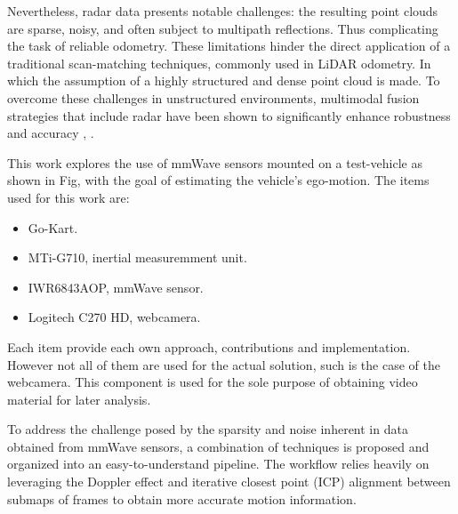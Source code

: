 Nevertheless, radar data presents notable challenges: the resulting point clouds are sparse, noisy, and often subject to multipath reflections. 
Thus complicating the task of reliable odometry.  
These limitations hinder the direct application of a traditional scan-matching techniques, commonly used in LiDAR odometry. In which the assumption of a highly structured and dense point cloud is made.
To overcome these challenges in unstructured environments, multimodal fusion strategies that include radar have been shown to significantly enhance robustness and accuracy \cite{Multimodal_Offroad}, \cite{HighSpeed_Estimation}.

\begin{comment}
    [25/09/2025]
    Here introduce the Go-Kart, dont leave it as "vehicle"
\end{comment}
This work explores the use of mmWave sensors mounted on a test-vehicle as shown in Fig, with the goal of estimating the vehicle's ego-motion.
The items used for this work are:
\begin{itemize}
    \item Go-Kart.
    \item MTi-G710, inertial measuremment unit.
    \item IWR6843AOP, mmWave sensor.
    \item Logitech C270 HD, webcamera.
\end{itemize}

Each item provide each own approach, contributions and implementation.
However not all of them are used for the actual solution, such is the case of the webcamera.
This component is used for the sole purpose of obtaining video material for later analysis.

\begin{comment}
    [25/09/2025]
    Check if this section shall be deleted or integrated with final result.
    As for integration is not such a great idea to implement a summarize of the project here.
    Only a brief introduction of the project shall discussed here.
    Contributions can be kept. As they are the whole intention of what it is accomplished here.
\end{comment}

To address the challenge posed by the sparsity and noise inherent in data obtained from mmWave sensors, a combination of techniques is proposed and organized into an easy-to-understand pipeline.
The workflow relies heavily on leveraging the Doppler effect and iterative closest point (ICP) alignment between submaps of frames to obtain more accurate motion information.


